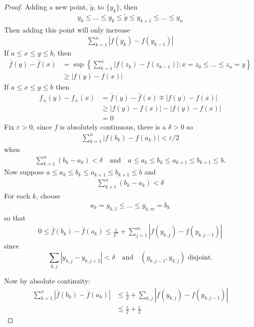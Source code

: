\begin{proof}
	Adding a new point, $\tilde{y}$, to $\{y_{k}\}$, then
	\begin{align*}
		y_0 \leq \ldots \leq y_k \leq \tilde{y} \leq y_{k+1} \leq \ldots \leq y_n
	\end{align*}
	Then adding this point will only increase
	\begin{align*}
		\sum_{k=1}^n | f( y_k) - f(y_{k-1}) |
	\end{align*}
	If $a \leq x \leq y \leq b$, then
	\begin{align*}
		\bar{f} (y) - \bar{f}(x) &= \sup \left\{ \sum_{k=1}^{n} |f (z_k) - f (z_{k - 1}) | : x = z_0 \leq \ldots \leq z_n = y \right\} \\
								 &\geq | f(y) - f(x) |
	\end{align*}
	If $a \leq x \leq y \leq b$ then
	 \begin{align*}
		 f_{\pm} (y) - f_{\pm} (x) &= \bar{f} (y) - \bar{f} (x) \mp | f(y) - f(x) | \\
								   &\geq |f(y) - f(x) | - | f(y) - f(x)| \\
								   &= 0
	\end{align*}
	Fix $\varepsilon > 0$, since $f$ is absolutely continuous, there is a $\delta > 0$ so
	\begin{align*}
		\sum_{k=1}^n | f (b_{k}) - f (a_k) | < \varepsilon/2
	\end{align*} when
	\begin{align*}
		\sum_{k=1}^n (b_k - a_k) < \delta \quad \text{and} \quad
		a \leq a_k \leq b_k \leq a_{k+1} \leq b_{k+1} \leq b.
	\end{align*}
	Now suppose $a \leq a_k \leq b_k \leq a_{k+1} \leq b_{k+1} \leq b$
	and
	\begin{align*}
		\sum_{k+1}^n (b_k - a_k) < \delta
	\end{align*}
	For each $k$, choose
	\begin{align*}
		a_k = y_{k,1} \leq \ldots \leq y_{k, m} = b_k
	\end{align*} so that
	\begin{align*}
		0 \leq \bar{f}(b_k) - \bar{f} (a_k) \leq \frac{\varepsilon}{2^{n}} + \sum_{j=1}^m |f(y_{k,j}) - f(y_{k, j-1}) |
	\end{align*}
	since
	\[
		\sum_{k,j} |y_{k,j} - y_{k,j+2} | < \delta \quad \text{and} \quad
		(y_{k, j-1}, y_{k,j}) \text{ disjoint.}
	\]

	\noindent Now by absolute continuity:
	\begin{align*}
		\sum_{k=1}^{n} | \bar{f}(b_k) - \bar{f}(a_k) | &\leq \frac{\varepsilon}{2} + \sum_{k,j} |f (y_{k,j}) - f(y_{k,j-1}) | \\
													   &\leq \frac{\varepsilon}{2} + \frac{\varepsilon}{2}
	\end{align*}

\end{proof}

